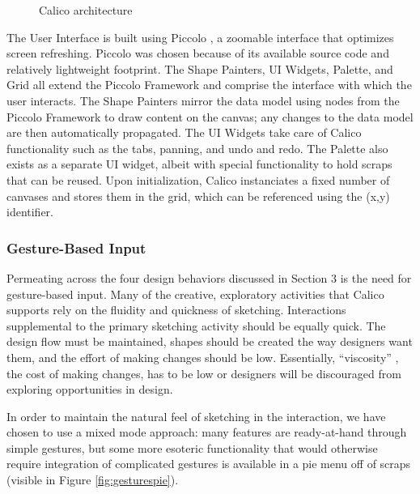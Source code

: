\begin{figure}
  \centering
 
\caption {Calico architecture}
\label{fig:arch}       %
\end{figure}
%

The User Interface is built using Piccolo \citep{Bederson}, a zoomable interface that optimizes screen refreshing.  Piccolo was chosen because of its available source code and relatively lightweight footprint.  The Shape Painters, UI Widgets, Palette, and Grid all extend the Piccolo Framework and comprise the interface with which the user interacts. The Shape Painters mirror the data model using nodes  from the Piccolo Framework to draw content on the canvas; any changes to the data model are then automatically propagated. The UI Widgets take care of Calico functionality such as the tabs, panning, and undo and redo. The Palette also exists as a separate UI widget, albeit with special functionality to hold scraps that can be reused. Upon initialization, Calico instanciates a fixed number of canvases and stores them in the grid, which can be referenced using the (x,y) identifier. 

\subsubsection {Gesture-Based Input}
\label{calico:5}

Permeating across the four design behaviors discussed in Section 3 is the need for gesture-based input. Many of the creative, exploratory activities that Calico supports rely on the fluidity and quickness of sketching. Interactions supplemental to the primary sketching activity should be equally quick. The design flow must be maintained, shapes should be created the way designers want them, and the effort of making changes should be low. Essentially, ``viscosity'' \citep{Petre}, the cost of making changes, has to be low or designers will be discouraged from exploring opportunities in design. 

In order to maintain the natural feel of sketching in the interaction, we have chosen to use a mixed mode approach: many features are ready-at-hand through simple gestures, but some more esoteric functionality that would otherwise require integration of complicated gestures is available in a pie menu off of scraps (visible in Figure \ref{fig:gesturespie}).

